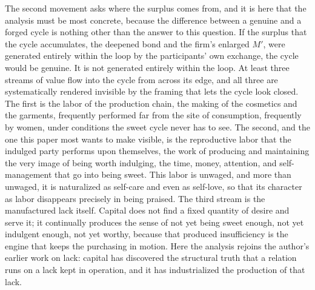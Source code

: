 The second movement asks where the surplus comes from, and it is here that the analysis must be most concrete, because the difference between a genuine and a forged cycle is nothing other than the answer to this question. If the surplus that the cycle accumulates, the deepened bond and the firm's enlarged $M'$, were generated entirely within the loop by the participants' own exchange, the cycle would be genuine. It is not generated entirely within the loop. At least three streams of value flow into the cycle from across its edge, and all three are systematically rendered invisible by the framing that lets the cycle look closed. The first is the labor of the production chain, the making of the cosmetics and the garments, frequently performed far from the site of consumption, frequently by women, under conditions the sweet cycle never has to see. The second, and the one this paper most wants to make visible, is the reproductive labor that the indulged party performs upon themselves, the work of producing and maintaining the very image of being worth indulging, the time, money, attention, and self-management that go into being sweet. This labor is unwaged, and more than unwaged, it is naturalized as self-care and even as self-love, so that its character as labor disappears precisely in being praised. The third stream is the manufactured lack itself. Capital does not find a fixed quantity of desire and serve it; it continually produces the sense of not yet being sweet enough, not yet indulgent enough, not yet worthy, because that produced insufficiency is the engine that keeps the purchasing in motion. Here the analysis rejoins the author's earlier work on lack: capital has discovered the structural truth that a relation runs on a lack kept in operation, and it has industrialized the production of that lack.

